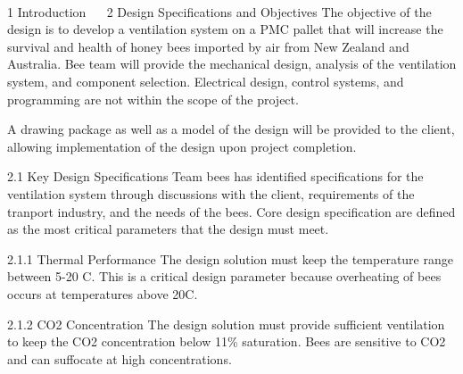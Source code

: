  
 
1	Introduction
 
2	Design Specifications and Objectives
The objective of the design is to develop a ventilation system on a PMC pallet that will increase the survival and health of honey bees imported by air from New Zealand and Australia. Bee team will provide the mechanical design, analysis of the ventilation system, and component selection. Electrical design, control systems, and programming are not within the scope of the project. 

A drawing package as well as a model of the design will be provided to the client, allowing implementation of the design upon project completion.





2.1	Key Design Specifications
Team bees has identified specifications for the ventilation system through discussions with the client, requirements of the tranport industry, and the needs of the bees. Core design specification are defined as the most critical parameters that the design must meet. 

2.1.1 Thermal Performance
The design solution must keep the temperature range between 5-20 C. This is a critical design parameter because overheating of bees occurs at temperatures above 20C.

2.1.2 CO2 Concentration
The design solution must provide sufficient ventilation to keep the CO2 concentration below 11\% saturation. Bees are sensitive to CO2 and can suffocate at high concentrations.

